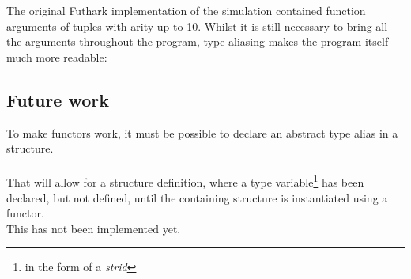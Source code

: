 The original Futhark implementation of the simulation contained function
arguments of tuples with arity up to 10. Whilst it is still necessary to bring
all the arguments throughout the program, type aliasing makes the program itself
much more readable:
\subsection{Future work}
To make functors work, it must be possible to declare an abstract type alias in
a structure.\\
\\
That will allow for a structure definition, where a type variable\footnote{in the form of a \textit{strid}} has been declared, but not defined, until the containing structure is instantiated using a functor.
\\
This has not been implemented yet.
\clearpage